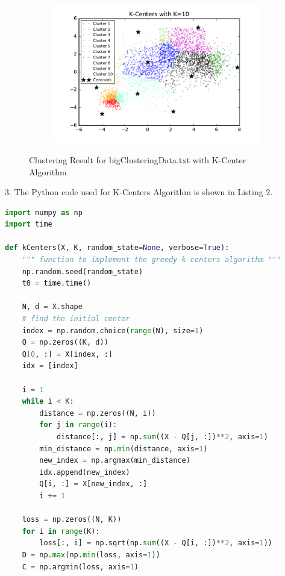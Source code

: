 \begin{description}
\begin{description}
\begin{figure}[!h]
\begin{subfigure}[b]{0.475\textwidth}
            \includegraphics[width=\textwidth]{./figures/bigClustering_kCenter_10.pdf}
        \end{subfigure}
        
        \caption{Clustering Result for bigClusteringData.txt with K-Center Algorithm}
        \label{fig:kcenter_bigClustering}
\end{figure}

\newpage
\item{3.} The Python code used for K-Centers Algorithm is shown in Listing 2.

\begin{lstlisting}[language=Python, caption=K-Centers Algorithm Python Code]
import numpy as np
import time

def kCenters(X, K, random_state=None, verbose=True):
    """ function to implement the greedy k-centers algorithm """
    np.random.seed(random_state)
    t0 = time.time()

    N, d = X.shape
    # find the initial center
    index = np.random.choice(range(N), size=1)
    Q = np.zeros((K, d))
    Q[0, :] = X[index, :]
    idx = [index]

    i = 1
    while i < K:
        distance = np.zeros((N, i))
        for j in range(i):
            distance[:, j] = np.sum((X - Q[j, :])**2, axis=1)
        min_distance = np.min(distance, axis=1)
        new_index = np.argmax(min_distance)
        idx.append(new_index)
        Q[i, :] = X[new_index, :]
        i += 1

    loss = np.zeros((N, K))
    for i in range(K):
        loss[:, i] = np.sqrt(np.sum((X - Q[i, :])**2, axis=1))
    D = np.max(np.min(loss, axis=1))
    C = np.argmin(loss, axis=1)


\end{lstlisting}
\end{description}
\end{description}
